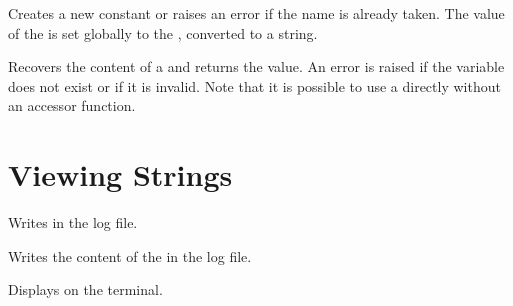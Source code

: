 \documentclass[oneside]{book}
\begin{document}
\begin{function}{\strConst}
\begin{syntax}
  
\end{syntax}
Creates a new constant  or raises an error if the name
is already taken.  The value of the  is set
globally to the , converted to a string.
\begin{codehigh}
\strConst {}
\end{codehigh}
\end{function}

\begin{function}{\strUse}
\begin{syntax}
 
\end{syntax}
Recovers the content of a  and returns the value.
An error is raised if the variable
does not exist or if it is invalid. Note that it is possible to use
a  directly without an accessor function.
\begin{codehigh}
\strUse \lTmpaStr
\end{codehigh}
\end{function}

\section{Viewing Strings}

\begin{function}{\strLog}
\begin{syntax}
 
\end{syntax}
Writes  in the log file.
\begin{codehigh}
\end{codehigh}
\end{function}

\begin{function}{\strVarLog}
\begin{syntax}
 
\end{syntax}
Writes the content of the  in the log file.
\begin{codehigh}
\strSet {}
\strVarLog \lTmpiStr
\end{codehigh}
\end{function}

\begin{function}{\strShow}
\begin{syntax}
 
\end{syntax}
Displays  on the terminal.
\begin{codehigh}
\end{codehigh}
\end{function}
\end{document}
